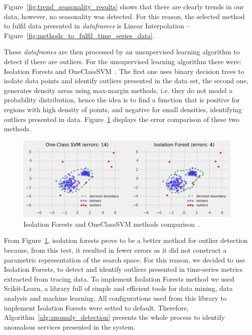 Figure~\ref{fig:trend_seasonality_results} shows that there are clearly trends in our data, however, no seasonality was detected. For this reason, the selected method to fulfil data presented in \emph{dataframes} is Linear Interpolation -- Figure~\ref{fig:methods_to_fulfil_time_series_data}.

These \emph{dataframes} are then processed by an unsupervised learning algorithm to detect if there are outliers. For the unsupervised learning algorithm there were: Isolation Forests and OneClassSVM~\cite{Zhou2017}. The first one uses binary decision trees to isolate data points and identify outliers presented in the data set, the second one, generates density areas using max-margin methods, i.e. they do not model a probability distribution, hence the idea is to find a function that is positive for regions with high density of points, and negative for small densities, identifying outliers presented in data. Figure~\ref{fig:isolation_forests_and_oneclasssvm_comparison} displays the error comparison of these two methods.

\begin{figure}[H]
    \centering\includegraphics[width=0.8\linewidth]{images/isolation_forests_and_oneclasssvm_comparison.pdf}
    \caption{Isolation Forests and OneClassSVM methods comparison~\cite{isolation_forests_and_oneclasssvm_comparison}.}
    \label{fig:isolation_forests_and_oneclasssvm_comparison}
\end{figure}

From Figure~\ref{fig:isolation_forests_and_oneclasssvm_comparison}, isolation forests prove to be a better method for outlier detection because, from this test, it resulted in fewer errors as it did not construct a parametric representation of the search space. For this reason, we decided to use Isolation Forests, to detect and identify outliers presented in time-series metrics extracted from tracing data. To implement Isolation Forests method we used Scikit-Learn, a library full of simple and efficient tools for data mining, data analysis and machine learning. All configurations used from this library to implement Isolation Forests were setted to default. Therefore, Algorithm~\ref{alg:anomaly_detection} presents the whole process to identify anomalous services presented in the system.

